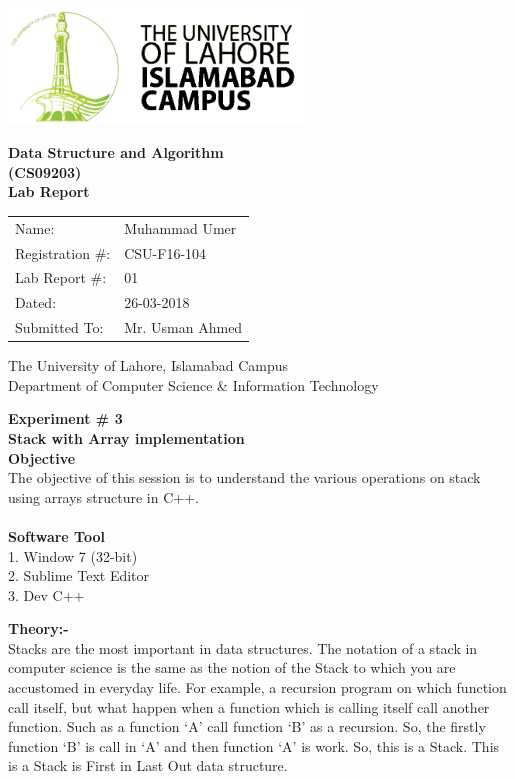 \documentclass[11pt]{article}            %
\begin{document}
\begin{titlepage}
    \centering
  \vfill
    \includegraphics[width=8cm]{uni_logo.png} \\ 
	\vskip2cm
    {\bfseries\Large
	Data Structure and Algorithm \\ (CS09203)\\
	
	\vskip2cm
	Lab Report 
	 
	\vskip2cm
	}    

\begin{center}
\begin{tabular}{ l l  } 

Name: & Muhammad Umer \\ 
Registration \#: & CSU-F16-104 \\ 
Lab Report \#: & 01 \\ 
 Dated:& 26-03-2018\\ 
Submitted To:& Mr. Usman Ahmed\\ 

\end{tabular}
\end{center}
    \vfill
    The University of Lahore, Islamabad Campus\\
Department of Computer Science \& Information Technology
\end{titlepage}


    
    {\bfseries\Large
\centering
	Experiment \# 3 \\

Stack with Array implementation\\
	
	}    
 \vskip1cm
 \textbf {Objective}\\ The objective of this session is to understand the various operations on stack using arrays structure in C++.\\~\\
 \textbf {Software Tool} \\
1.  Window 7 (32-bit)\\
2. Sublime Text Editor\\
3. Dev C++

\textbf{Theory:-}\\
Stacks are the most important in data structures. The notation of a stack in computer science is the
same as the notion of the Stack to which you are accustomed in everyday life. For example, a
recursion program on which function call itself, but what happen when a function which is calling
itself call another function. Such as a function ‘A’ call function ‘B’ as a recursion. So, the firstly
function ‘B’ is call in ‘A’ and then function ‘A’ is work. So, this is a Stack. This is a Stack is First
in Last Out data structure.\\~\\
\end{document}
